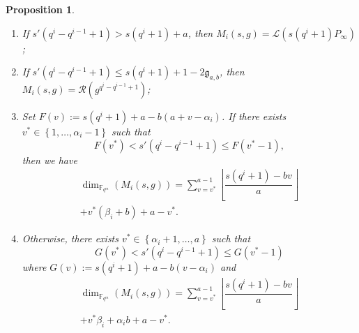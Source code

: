 \documentclass[lettersize,journal]{IEEEtran}
\theoremstyle{plain}
\newtheorem{proposition}[thm]{Proposition}
\theoremstyle{definition}
\theoremstyle{remark}
\newcommand{\calL}{\mathcal{L}}
\newcommand{\calR}{\mathcal{R}}
\newcommand{\fqm}{\mathbb{F}_{q^m}}
\newcommand{\set}[1]{\left\{#1\right\}}
\begin{document}
	\begin{proposition} \label{prop:dim_M_i's}
		\begin{enumerate}
			\item If $s'(q^i-q^{i-1}+1) > s(q^i+1)+a$, then $M_i(s,g) = \calL(s(q^i+1)P_\infty)$;
			
			\item If $s'(q^i-q^{i-1}+1) \leq s(q^i+1)+1-2\mathfrak{g}_{a,b}$, then $M_i(s,g) = \calR(g^{q^{i}-q^{i-1}+1})$;
			
			\item Set $F(v) := s(q^i+1)+a-b(a+v-\alpha_i)$. If there exists $v^* \in \set{1,\dots,\alpha_i-1}$ such that
			$$ F(v^*) < s'(q^i-q^{i-1}+1) \leq  F(v^*-1),$$
			then we have 
			\begin{multline*}
			\dim_{\fqm}(M_i(s,g)) = \sum\limits_{v=v^*}^{a-1} \left\lfloor \dfrac{s(q^i+1)-bv}{a} \right\rfloor\\ + v^*(\beta_i+b) + a-v^*.
			\end{multline*}
			
			\item Otherwise, there exists $v^* \in \set{\alpha_i+1,\dots,a}$ such that
			$$ G(v^*) < s'(q^i-q^{i-1}+1) \leq  G(v^*-1)$$
			where $G(v) := s(q^i+1)+a-b(v-\alpha_i)$ and
			\begin{multline*}
			\dim_{\fqm}(M_i(s,g)) = \sum\limits_{v=v^*}^{a-1} \left\lfloor \dfrac{s(q^i+1)-bv}{a} \right\rfloor\\ + v^*\beta_i + \alpha_ib +a-v^*.
			\end{multline*}				
		\end{enumerate}
	\end{proposition}
	
\end{document}
